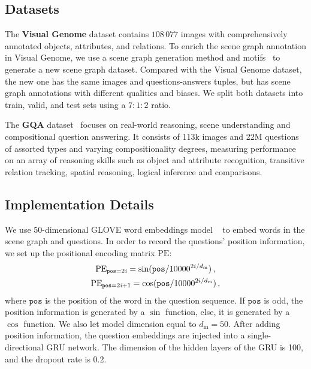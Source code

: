 \documentclass[letterpaper]{article} %
\begin{document}
\subsection{Datasets}

\quad The \textbf{Visual Genome} dataset contains $108 \, 077$ images with comprehensively annotated objects, attributes, and relations. To enrich the scene graph annotation in Visual Genome, we use a scene graph generation method and motifs~\cite{DBLP:conf/cvpr/ZellersYTC18} to generate a new scene graph dataset. 
Compared with the Visual Genome dataset, the new one has the same images and questions-answers tuples, but has scene graph annotations with different qualities and biases. 
We split both datasets into train, valid, and test sets using a $7:1:2$ ratio. 

\quad The \textbf{GQA} dataset~\cite{DBLP:conf/cvpr/HudsonM19} focuses on real-world reasoning, scene understanding and compositional question answering. It consists of 113k images and 22M questions of assorted types and varying compositionality degrees, measuring performance on an array of reasoning skills such as object and attribute recognition, transitive relation tracking, spatial reasoning, logical inference and comparisons.



\subsection{Implementation Details}

We use 50-dimensional GLOVE word embeddings model ~\cite{pennington-etal-2014-glove} to embed words in the scene graph and questions. In order to record the questions' position information, we set up the positional encoding matrix $\textrm{PE}$:
\begin{gather}\notag
    \textrm{PE}_{\texttt{pos}=2\emph{i}} = \sin(\texttt{pos}/10000^{2i/d_{\textrm{m}}}) \, ,\\
    \textrm{PE}_{\texttt{pos}=2\emph{i}+1} = \cos(\texttt{pos}/10000^{2i/d_{\textrm{m}}}) \, , \notag
\end{gather}
where $\texttt{pos}$ is the position of the word in the question sequence. 
If $\texttt{pos}$ is odd, the position information is generated by a $\sin$ function, else, it is generated by a $\cos$ function. 
We also let model dimension equal to $d_{\textrm{m}}=50$.
After adding position information, the question embeddings are injected into a single-directional GRU network. 
The dimension of the hidden layers of the GRU is 100, and the dropout rate is 0.2.
\end{document}
